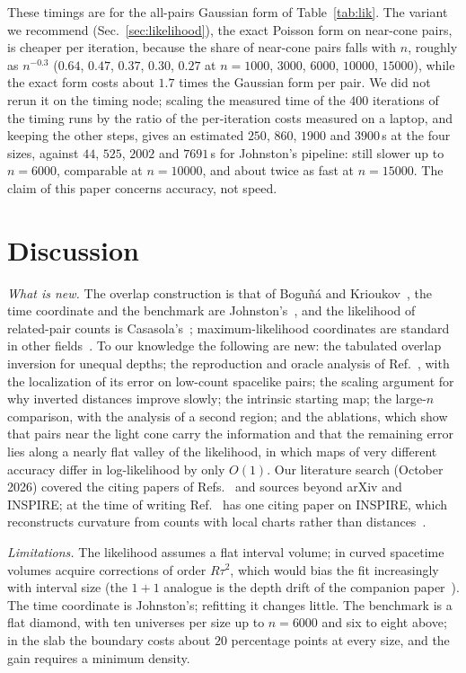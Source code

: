 \documentclass[prd,twocolumn,superscriptaddress,nofootinbib,amsmath,amssymb,floatfix]{revtex4-2}
\begin{document}
These timings are for the all-pairs Gaussian form of Table~\ref{tab:lik}. The variant we recommend (Sec.~\ref{sec:likelihood}), the exact Poisson form on near-cone pairs, is cheaper per iteration, because the share of near-cone pairs falls with $n$, roughly as $n^{-0.3}$ ($0.64$, $0.47$, $0.37$, $0.30$, $0.27$ at $n=1000$, $3000$, $6000$, $10000$, $15000$), while the exact form costs about $1.7$ times the Gaussian form per pair. We did not rerun it on the timing node; scaling the measured time of the 400 iterations of the timing runs by the ratio of the per-iteration costs measured on a laptop, and keeping the other steps, gives an estimated $250$, $860$, $1900$ and $3900$\,s at the four sizes, against $44$, $525$, $2002$ and $7691$\,s for Johnston's pipeline: still slower up to $n=6000$, comparable at $n=10000$, and about twice as fast at $n=15000$. The claim of this paper concerns accuracy, not speed.

\section{Discussion}\label{sec:disc}
\emph{What is new.} The overlap construction is that of Bogu\~n\'a and Krioukov~\cite{BK24}, the time coordinate and the benchmark are Johnston's~\cite{Johnston25}, and the likelihood of related-pair counts is Casasola's~\cite{Casasola26}; maximum-likelihood coordinates are standard in other fields~\cite{Ramsay77,Hoff02,BPK10,Mercator19,Sim21}. To our knowledge the following are new: the tabulated overlap inversion for unequal depths; the reproduction and oracle analysis of Ref.~\cite{Johnston25}, with the localization of its error on low-count spacelike pairs; the scaling argument for why inverted distances improve slowly; the intrinsic starting map; the large-$n$ comparison, with the analysis of a second region; and the ablations, which show that pairs near the light cone carry the information and that the remaining error lies along a nearly flat valley of the likelihood, in which maps of very different accuracy differ in log-likelihood by only $O(1)$. Our literature search (October 2026) covered the citing papers of Refs.~\cite{BK24,Johnston25,CloughEvans16,Casasola26} and sources beyond arXiv and INSPIRE; at the time of writing Ref.~\cite{Johnston25} has one citing paper on INSPIRE, which reconstructs curvature from counts with local charts rather than distances~\cite{Madsen26}.

\emph{Limitations.} The likelihood assumes a flat interval volume; in curved spacetime volumes acquire corrections of order $R\tau^2$, which would bias the fit increasingly with interval size (the $1+1$ analogue is the depth drift of the companion paper~\cite{Toolkit}). The time coordinate is Johnston's; refitting it changes little. The benchmark is a flat diamond, with ten universes per size up to $n=6000$ and six to eight above; in the slab the boundary costs about $20$ percentage points at every size, and the gain requires a minimum density.
\end{document}
